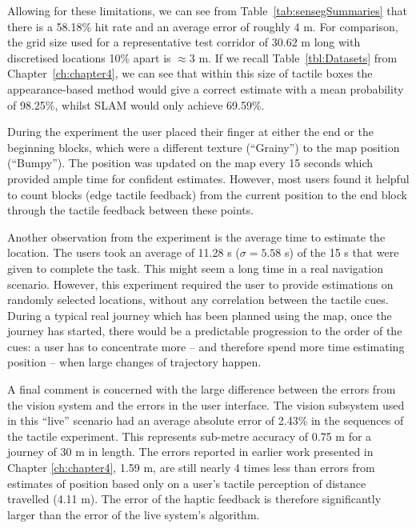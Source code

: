 Allowing for these limitations, we can see from Table~\ref{tab:sensegSummaries} that there is a 58.18\% hit rate and an average error of roughly 4 m. For comparison, the grid size used for a representative test corridor of $30.62$ m long with discretised locations 10\% apart is $\approx 3$ m. If we recall Table~\ref{tbl:Datasets} from Chapter~\ref{ch:chapter4}, we can see that within this size of tactile boxes the appearance-based method would give a correct estimate with a mean probability of 98.25\%, whilst SLAM would only achieve 69.59\%.

During the experiment the user placed their finger at either the end or the beginning blocks, which were a different texture (``Grainy'') to the map position (``Bumpy''). The position was updated on the map every 15 seconds which provided ample time for confident estimates. However, most users found it helpful to count blocks (edge tactile feedback) from the current position to the end block through the tactile feedback between these points.

Another observation from the experiment is the average time to estimate the location. The users took an average of 11.28 s ($\sigma = 5.58$ s) of the 15 s that were given to complete the task. This might seem a long time in a real navigation scenario. However, this experiment required the user to provide estimations on randomly selected locations, without any correlation between the tactile cues. During a typical real journey which has been planned using the map, once the journey has started, there would be a predictable progression to the order of the cues: a user has to concentrate more -- and therefore spend more time estimating position -- when large changes of trajectory happen.

A final comment is concerned with the large difference between the errors from the vision system and the errors in the user interface. The vision subsystem used in this ``live'' scenario had an average absolute error of 2.43\% in the sequences of the tactile experiment. This represents sub-metre accuracy of 0.75 m for a journey of 30 m in length. The errors reported in earlier work presented in Chapter \ref{ch:chapter4}, 1.59 m, are still nearly 4 times less than errors from estimates of position based only on a user's tactile perception of distance travelled (4.11 m). The error of the haptic feedback is therefore significantly larger than the error of the live system's algorithm.


